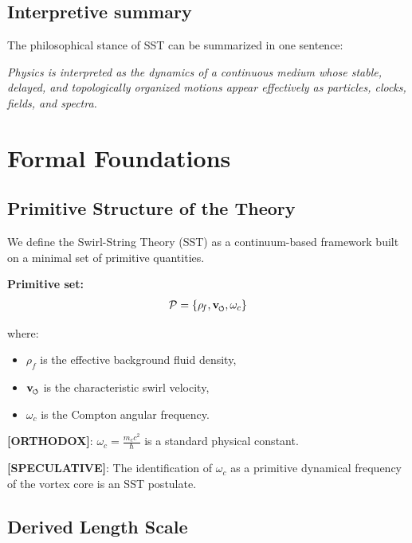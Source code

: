\documentclass[11pt]{article}
\theoremstyle{definition}
\theoremstyle{plain}
\theoremstyle{remark}
\newcommand{\swirlarrow}{\mathchoice{\mkern-2mu\scriptstyle\boldsymbol{\circlearrowleft}}{\mkern-2mu\scriptstyle\boldsymbol{\circlearrowleft}}{\mkern-2mu\scriptscriptstyle\boldsymbol{\circlearrowleft}}{\mkern-2mu\scriptscriptstyle\boldsymbol{\circlearrowleft}}}
\newcommand{\vswirl}{\mathbf{v}_{\swirlarrow}}
\newcommand{\rhoF}{{\rho_{\!f}}}
\begin{document}
    \subsection{Interpretive summary}
        The philosophical stance of SST can be summarized in one sentence:
        \begin{center}
            \textit{Physics is interpreted as the dynamics of a continuous medium whose stable, delayed, and topologically organized motions appear effectively as particles, clocks, fields, and spectra.}
        \end{center}

\section{Formal Foundations}
    \label{sec:foundations}
    
    \subsection{Primitive Structure of the Theory}
        
        We define the Swirl-String Theory (SST) as a continuum-based framework built on a minimal set of primitive quantities.
        
        \textbf{Primitive set:}
        \begin{align}
            \mathcal{P} = \{ \rhoF, \vswirl, \omega_c \}
        \end{align}
        
        where:
        \begin{itemize}
            \item $\rhoF$ is the effective background fluid density,
            \item $\vswirl$ is the characteristic swirl velocity,
            \item $\omega_c$ is the Compton angular frequency.
        \end{itemize}
        
        \textbf{[ORTHODOX]}: $\omega_c = \frac{m_e c^2}{\hbar}$ is a standard physical constant.
        
        \textbf{[SPECULATIVE]}: The identification of $\omega_c$ as a primitive dynamical frequency of the vortex core is an SST postulate.
    
    \subsection{Derived Length Scale}
        
\end{document}
